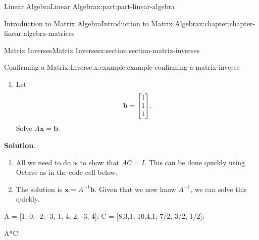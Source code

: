 \documentclass[twoside,10pt,]{book}
\newcommand{\blocktitlefont}{\relax}
\numberwithin{equation}{part}
\providecommand{\vb}[1]{\mathbf{#1}}
\begin{document}
\begin{partptx}{Linear Algebra}{}{Linear Algebra}{}{}{x:part:part-linear-algebra}
\begin{chapterptx}{Introduction to Matrix Algebra}{}{Introduction to Matrix Algebra}{}{}{x:chapter:chapter-linear-algebra-matrices}
\begin{sectionptx}{Matrix Inverses}{}{Matrix Inverses}{}{}{x:section:section-matrix-inverses}
\begin{example}{Confirming a Matrix Inverse.}{x:example:example-confirming-a-matrix-inverse}
\begin{enumerate}
is the inverse of \(A\).%
\item{}Let%
\begin{equation*}
\vb{b} = \mqty[1 \\ 1 \\ 1].
\end{equation*}
Solve \(A\vb{x} = \vb{b}\).%
\end{enumerate}
\par\smallskip%
\noindent\textbf{\blocktitlefont Solution}.\hypertarget{g:solution:idm1608277096}{}\quad{}%
\begin{enumerate}
\item{}All we need to do is to show that \(AC = I\). This can be done quickly using Octave as in the code cell below.%
\item{}The solution is \(\vb{x} = A^{-1}\vb{b}\). Given that we now know \(A^{-1}\), we can solve this quickly.%
\end{enumerate}
\end{example}
\begin{sageinput}
A = [1, 0, -2; -3, 1, 4; 2, -3, 4];
C = [8,3,1; 10,4,1; 7/2, 3/2, 1/2];

A*C %


\end{sageinput}
\end{sectionptx}
\end{chapterptx}
\end{partptx}
\end{document}
